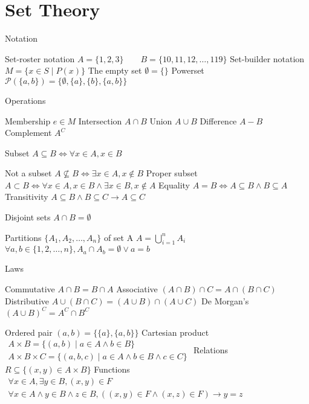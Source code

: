 \section{Set Theory}
\begin{itemize}
\bulletitem Notation
\begin{itemize}
\bulletitem Set-roster notation \( A = \{ 1,2,3 \} \qquad B = \{ 10,11,12, \ldots ,119 \} \)
\bulletitem Set-builder notation \( M = \{ x \in S \mid P(x) \} \)
\bulletitem The empty set \( \emptyset = \{ \} \)
\bulletitem Powerset \( \mathscr{P}(\{ a,b \}) = \{ \emptyset ,\{ a \} , \{ b \} , \{ a,b \} \} \)
\end{itemize}
\bulletitem Operations
\begin{itemize}
\bulletitem Membership \( e \in M \)
\bulletitem Intersection \( A \cap B \)
\bulletitem Union \( A \cup B \)
\bulletitem Difference \( A - B \)
\bulletitem Complement \( A^C \)
\end{itemize}
\bulletitem Subset \( A \subseteq B \Leftrightarrow \forall x \in A, x \in B \)
\begin{itemize}
\bulletitem Not a subset \( A \not\subseteq B \Leftrightarrow \exists x \in A, x \notin B \)
\bulletitem Proper subset \( A \subset B \Leftrightarrow \forall x \in A, x \in B \land \exists x \in B, x  \notin A \)
\bulletitem Equality \( A=B \Leftrightarrow A \subseteq B \land B \subseteq A \)
\bulletitem Transitivity \( A \subseteq B \land B \subseteq C \rightarrow A \subseteq C \)
\end{itemize}
\bulletitem Disjoint sets \( A \cap B = \emptyset \)
\begin{itemize}
\bulletitem Partitions \( \{ A_1,A_2, \ldots ,A_n \} \) of set A
\bulletitem \( A = \bigcup_{i=1}^n A_i \)
\bulletitem \( \forall a,b \in \{ 1,2, \ldots ,n \}, A_a \cap A_b = \emptyset \lor a=b \)
\end{itemize}
\bulletitem Laws
\begin{itemize}
\bulletitem Commutative \( A \cap B = B \cap A \)
\bulletitem Associative \( (A \cap B) \cap C = A \cap (B \cap C) \)
\bulletitem Distributive \( A \cup (B \cap C) = (A \cup B) \cap (A \cup C) \)
\bulletitem De Morgan's \( (A \cup B)^C = A^C \cap B^C \)
\end{itemize}
\bulletitem Ordered pair \( (a,b)= \{ \{ a \} , \{ a,b \} \} \)
\bulletitem Cartesian product \( \begin{matrix} A \times B = \{ (a,b) \mid a \in A \land b \in B \}\\ A \times B \times C = \{ (a,b,c) \mid a \in A \land b \in B \land c \in C \} \end{matrix} \)
\bulletitem Relations \( R \subseteq \{ (x,y) \in A \times B \} \)
\bulletitem Functions \( \begin{matrix} \forall x \in A, \exists y \in B, (x,y) \in F\\ \forall x \in A \land y \in B \land z \in B, \left( (x,y) \in F \land (x,z) \in F \right) \rightarrow y=z \end{matrix} \)
\end{itemize}
